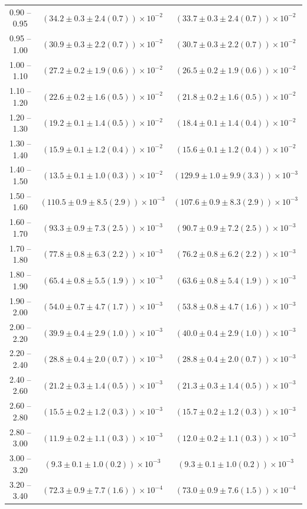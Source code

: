 \begin{table}
\begin{center}
\begin{tabular}{ c | c c }
0.90 -- 0.95 & $(34.2\pm0.3\pm2.4(0.7))\times10^{-2}$ & $(33.7\pm0.3\pm2.4(0.7))\times10^{-2}$ \\ 
0.95 -- 1.00 & $(30.9\pm0.3\pm2.2(0.7))\times10^{-2}$ & $(30.7\pm0.3\pm2.2(0.7))\times10^{-2}$ \\ 
1.00 -- 1.10 & $(27.2\pm0.2\pm1.9(0.6))\times10^{-2}$ & $(26.5\pm0.2\pm1.9(0.6))\times10^{-2}$ \\ 
1.10 -- 1.20 & $(22.6\pm0.2\pm1.6(0.5))\times10^{-2}$ & $(21.8\pm0.2\pm1.6(0.5))\times10^{-2}$ \\ 
1.20 -- 1.30 & $(19.2\pm0.1\pm1.4(0.5))\times10^{-2}$ & $(18.4\pm0.1\pm1.4(0.4))\times10^{-2}$ \\ 
1.30 -- 1.40 & $(15.9\pm0.1\pm1.2(0.4))\times10^{-2}$ & $(15.6\pm0.1\pm1.2(0.4))\times10^{-2}$ \\ 
1.40 -- 1.50 & $(13.5\pm0.1\pm1.0(0.3))\times10^{-2}$ & $(129.9\pm1.0\pm9.9(3.3))\times10^{-3}$ \\ 
1.50 -- 1.60 & $(110.5\pm0.9\pm8.5(2.9))\times10^{-3}$ & $(107.6\pm0.9\pm8.3(2.9))\times10^{-3}$ \\ 
1.60 -- 1.70 & $(93.3\pm0.9\pm7.3(2.5))\times10^{-3}$ & $(90.7\pm0.9\pm7.2(2.5))\times10^{-3}$ \\ 
1.70 -- 1.80 & $(77.8\pm0.8\pm6.3(2.2))\times10^{-3}$ & $(76.2\pm0.8\pm6.2(2.2))\times10^{-3}$ \\ 
1.80 -- 1.90 & $(65.4\pm0.8\pm5.5(1.9))\times10^{-3}$ & $(63.6\pm0.8\pm5.4(1.9))\times10^{-3}$ \\ 
1.90 -- 2.00 & $(54.0\pm0.7\pm4.7(1.7))\times10^{-3}$ & $(53.8\pm0.8\pm4.7(1.6))\times10^{-3}$ \\ 
2.00 -- 2.20 & $(39.9\pm0.4\pm2.9(1.0))\times10^{-3}$ & $(40.0\pm0.4\pm2.9(1.0))\times10^{-3}$ \\ 
2.20 -- 2.40 & $(28.8\pm0.4\pm2.0(0.7))\times10^{-3}$ & $(28.8\pm0.4\pm2.0(0.7))\times10^{-3}$ \\ 
2.40 -- 2.60 & $(21.2\pm0.3\pm1.4(0.5))\times10^{-3}$ & $(21.3\pm0.3\pm1.4(0.5))\times10^{-3}$ \\ 
2.60 -- 2.80 & $(15.5\pm0.2\pm1.2(0.3))\times10^{-3}$ & $(15.7\pm0.2\pm1.2(0.3))\times10^{-3}$ \\ 
2.80 -- 3.00 & $(11.9\pm0.2\pm1.1(0.3))\times10^{-3}$ & $(12.0\pm0.2\pm1.1(0.3))\times10^{-3}$ \\ 
3.00 -- 3.20 & $(9.3\pm0.1\pm1.0(0.2))\times10^{-3}$ & $(9.3\pm0.1\pm1.0(0.2))\times10^{-3}$ \\ 
3.20 -- 3.40 & $(72.3\pm0.9\pm7.7(1.6))\times10^{-4}$ & $(73.0\pm0.9\pm7.6(1.5))\times10^{-4}$ \\ 

\end{tabular}
\end{center}
\end{table}
